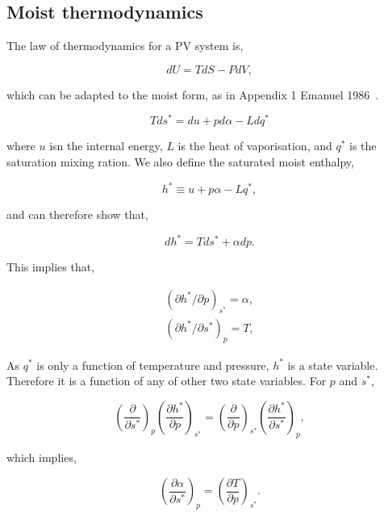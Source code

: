 \subsection{Moist thermodynamics}
\label{sec:moist-thermodynamics}

The law of thermodynamics for a PV system is,

\begin{equation}
d U=T d S-P d V,
\end{equation}

which can be adapted to the moist form, as in
Appendix 1 Emanuel 1986~\cite{emanuel1986air}.

\begin{equation}
T d s^{*}=d u+p d \alpha-L d q^{*}
\end{equation}

where $u$ isn the internal energy, $L$ is the heat of vaporisation,
and $q^{*}$ is the saturation mixing ration.
We also define the saturated  moist enthalpy,

\begin{equation}
h^{*} \equiv u+p \alpha-L q^{*},
\end{equation}

and can therefore show that,

\begin{equation}
d h^{*}=T d s^{*}+\alpha d p.
\end{equation}

This implies that,

\begin{equation}
\begin{array}{l}
\left(\partial h^{*} / \partial p\right)_{s^{*}}=\alpha, \\
\left(\partial h^{*} / \partial s^{*}\right)_{p}=T,
\end{array}
\end{equation}

As $q^{*}$ is only a function of temperature and pressure,
$h^{*}$ is a state variable. Therefore it is a function of
any of other two state variables. For $p$ and $s^{*}$,

\begin{equation}
\left(\frac{\partial}{\partial s^{*}}\right)_{p}\left(\frac{\partial h^{*}}{\partial p}\right)_{s^{*}}=\left(\frac{\partial}{\partial p}\right)_{s^{*}}\left(\frac{\partial h^{*}}{\partial s^{*}}\right)_{p},
\end{equation}

which implies,

\begin{equation}
\left(\frac{\partial \alpha}{\partial s^{*}}\right)_{p}=\left(\frac{\partial T}{\partial p}\right)_{s^{*}}.
\end{equation}

